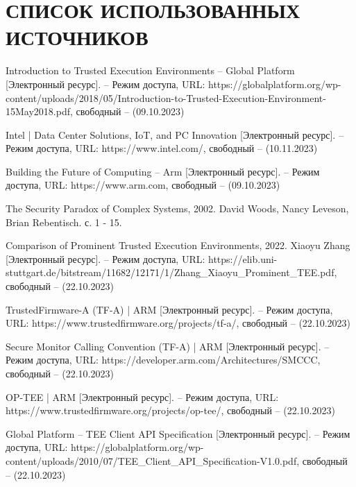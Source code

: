 \section*{СПИСОК ИСПОЛЬЗОВАННЫХ ИСТОЧНИКОВ}

\begingroup
\renewcommand{\section}[2]{}
\begin{thebibliography}{}
Introduction to Trusted Execution Environments -- Global Platform [Электронный ресурс]. – Режим доступа, URL: https://globalplatform.org/wp-content/uploads/2018/05/Introduction-to-Trusted-Execution-Environment-15May2018.pdf, свободный – (09.10.2023)

Intel | Data Center Solutions, IoT, and PC Innovation [Электронный ресурс]. – Режим доступа, URL: https://www.intel.com/, свободный – (10.11.2023)

Building the Future of Computing – Arm [Электронный ресурс]. – Режим доступа, URL: https://www.arm.com, свободный – (09.10.2023)

The Security Paradox of Complex Systems, 2002. David Woods, Nancy Leveson, Brian Rebentisch. с. 1 - 15.

Comparison of Prominent Trusted Execution Environments, 2022. Xiaoyu Zhang [Электронный ресурс]. – Режим доступа, URL: https://elib.uni-stuttgart.de/bitstream/11682/12171/1/Zhang\_Xiaoyu\_Prominent\_TEE.pdf, свободный – (22.10.2023)

TrustedFirmware-A (TF-A) | ARM [Электронный ресурс]. – Режим доступа, URL: https://www.trustedfirmware.org/projects/tf-a/, свободный – (22.10.2023)

Secure Monitor Calling Convention (TF-A) | ARM [Электронный ресурс]. – Режим доступа, URL: https://developer.arm.com/Architectures/SMCCC, свободный – (22.10.2023)

OP-TEE | ARM [Электронный ресурс]. – Режим доступа, URL: https://www.trustedfirmware.org/projects/op-tee/, свободный – (22.10.2023)

Global Platform -- TEE Client API Specification [Электронный ресурс]. – Режим доступа, URL: https://globalplatform.org/wp-content/uploads/2010/07/TEE\_Client\_API\_Specification-V1.0.pdf, свободный – (22.10.2023)


\end{thebibliography}
